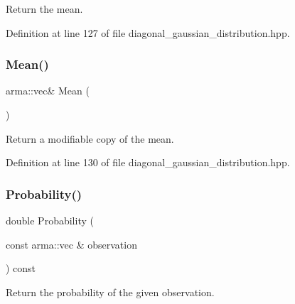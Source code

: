 Return the mean. 



Definition at line 127 of file diagonal\+\_\+gaussian\+\_\+distribution.\+hpp.

\mbox{\label{classmlpack_1_1distribution_1_1DiagonalGaussianDistribution_a94becb1cd872c0334328c37f130db253}} 
\subsubsection{Mean()\hspace{0.1cm}{\footnotesize\ttfamily [2/2]}}
{\footnotesize\ttfamily arma\+::vec\& Mean (\begin{DoxyParamCaption}{ }\end{DoxyParamCaption})\hspace{0.3cm}{\ttfamily [inline]}}



Return a modifiable copy of the mean. 



Definition at line 130 of file diagonal\+\_\+gaussian\+\_\+distribution.\+hpp.

\mbox{\label{classmlpack_1_1distribution_1_1DiagonalGaussianDistribution_ab72935d592516e77511d0b5e703c0d41}} 
\subsubsection{Probability()\hspace{0.1cm}{\footnotesize\ttfamily [1/2]}}
{\footnotesize\ttfamily double Probability (\begin{DoxyParamCaption}\item[{const arma\+::vec \&}]{observation }\end{DoxyParamCaption}) const\hspace{0.3cm}{\ttfamily [inline]}}



Return the probability of the given observation. 



